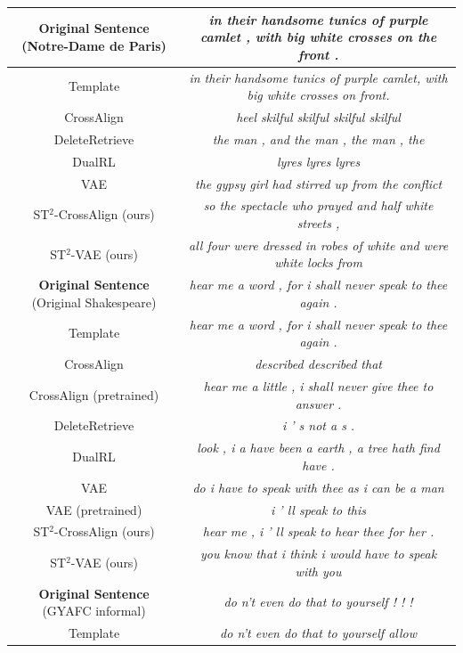 \begin{table}[th]\footnotesize
	\centering
	\begin{tabular}{c|c}
		\hline
		\textbf{Original Sentence} (Notre-Dame de Paris) & \emph{in their handsome tunics of purple camlet , with big white crosses on the front .} \\
		\hline
		Template & \emph{in their handsome tunics of purple camlet, with big white crosses on front.} \\
		CrossAlign & \emph{heel skilful skilful skilful skilful} \\
		DeleteRetrieve & \emph{the man , and the man , the man , the} \\
		DualRL & \emph{lyres lyres lyres} \\
		VAE & \emph{the gypsy girl had stirred up from the conflict} \\
		\hline
		ST$^2$-CrossAlign (ours) & \emph{so the spectacle who prayed and half white streets ,} \\
		ST$^2$-VAE (ours) & \emph{all four were dressed in robes of white and were white locks from} \\
		\hline
		\hline
		\textbf{Original Sentence} (Original Shakespeare) & \emph{hear me a word , for i shall never speak to thee again .} \\
		\hline
		Template & \emph{hear me a word , for i shall never speak to thee again .} \\
		CrossAlign & \emph{described described that} \\
		CrossAlign (pretrained) & \emph{hear me a little , i shall never give thee to answer .} \\
		DeleteRetrieve & \emph{i ’ s not a s .} \\
		DualRL & \emph{look , i a have been a earth , a tree hath find have .} \\
		VAE & \emph{do i have to speak with thee as i can be a man} \\
		VAE (pretrained) & \emph{i ’ ll speak to this} \\
		\hline
		ST$^2$-CrossAlign (ours) & \emph{hear me , i ’ ll speak to hear thee for her .} \\
		ST$^2$-VAE (ours) & \emph{you know that i think i would have to speak with you} \\
		\hline
		\hline
		\textbf{Original Sentence} (GYAFC informal) & \emph{do n't even do that to yourself ! ! !} \\
		\hline
		Template & \emph{do n't even do that to yourself allow} \\

\end{tabular}
\end{table}
